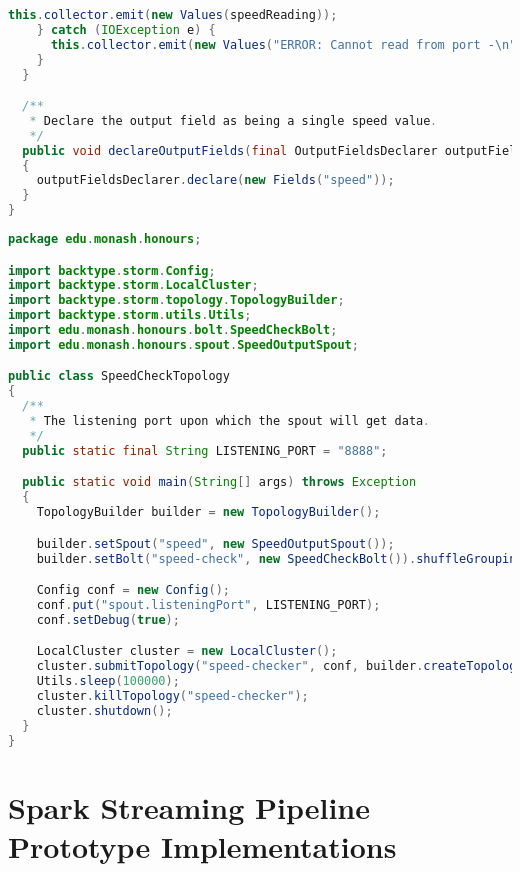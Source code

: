 \begin{lstlisting}[language=java,caption=edu.monash.honours.spout.SpeedOutputSpout (Java),label=storm-spout]
      this.collector.emit(new Values(speedReading));
    } catch (IOException e) {
      this.collector.emit(new Values("ERROR: Cannot read from port -\n" + e.getMessage()));
    }
  }

  /**
   * Declare the output field as being a single speed value.
   */
  public void declareOutputFields(final OutputFieldsDeclarer outputFieldsDeclarer)
  {
    outputFieldsDeclarer.declare(new Fields("speed"));
  }
}
\end{lstlisting}
\clearpage

\begin{lstlisting}[language=java,caption=edu.monash.honours.SpeedCheckTopology (Java),label=storm-topology]
package edu.monash.honours;

import backtype.storm.Config;
import backtype.storm.LocalCluster;
import backtype.storm.topology.TopologyBuilder;
import backtype.storm.utils.Utils;
import edu.monash.honours.bolt.SpeedCheckBolt;
import edu.monash.honours.spout.SpeedOutputSpout;

public class SpeedCheckTopology
{
  /**
   * The listening port upon which the spout will get data.
   */
  public static final String LISTENING_PORT = "8888";

  public static void main(String[] args) throws Exception
  {
    TopologyBuilder builder = new TopologyBuilder();

    builder.setSpout("speed", new SpeedOutputSpout());
    builder.setBolt("speed-check", new SpeedCheckBolt()).shuffleGrouping("speed");

    Config conf = new Config();
    conf.put("spout.listeningPort", LISTENING_PORT);
    conf.setDebug(true);

    LocalCluster cluster = new LocalCluster();
    cluster.submitTopology("speed-checker", conf, builder.createTopology());
    Utils.sleep(100000);
    cluster.killTopology("speed-checker");
    cluster.shutdown();
  }
}
\end{lstlisting}

\clearpage
\chapter{Spark Streaming Pipeline Prototype Implementations}
\label{lst:spark}

